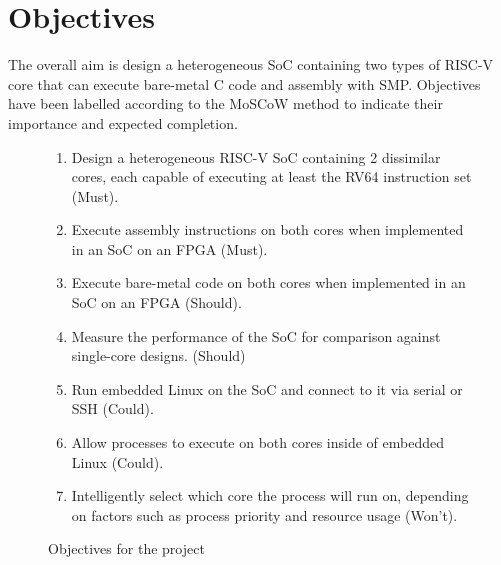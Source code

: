 \section{Objectives}
The overall aim is design a heterogeneous SoC containing two types of RISC-V core that can execute bare-metal C code and assembly with SMP. Objectives have been labelled according to the MoSCoW method\cite{case-method-fasttrack} to indicate their importance and expected completion.
\begin{figure}[h!]
    \centering
    \begin{enumerate}
        \item Design a heterogeneous RISC-V SoC containing 2 dissimilar cores, each capable of executing at least the RV64 instruction set (Must).
        \item Execute assembly instructions on both cores when implemented in an SoC on an FPGA (Must).
        \item Execute bare-metal code on both cores when implemented in an SoC on an FPGA (Should).
        \item Measure the performance of the SoC for comparison against single-core designs. (Should)
        \item Run embedded Linux on the SoC and connect to it via serial or SSH (Could).
        \item Allow processes to execute on both cores inside of embedded Linux (Could).
        \item Intelligently select which core the process will run on, depending on factors such as process priority and resource usage (Won't).
    \end{enumerate}
    \caption{Objectives for the project}
    \label{fig:objectives}
\end{figure}